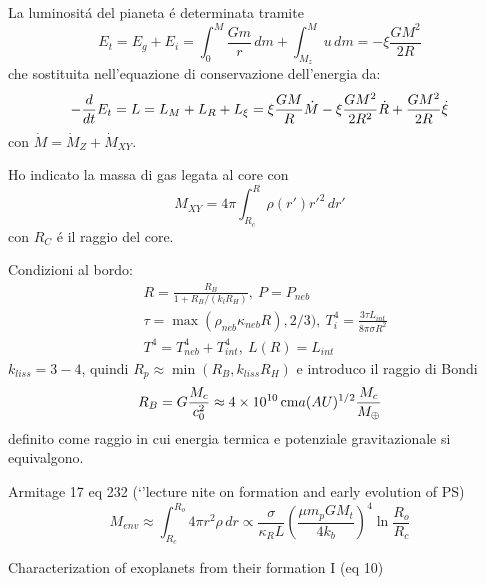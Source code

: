 \begin{reworking}
	La luminosit\'a del pianeta \'e determinata tramite
	\begin{equation}
	E_t=E_g+E_i=\int_0^M\frac{Gm}{r}\,dm+\int_{M_z}^Mu\,dm=-\xi\frac{GM^2}{2R}
	\end{equation}
	che sostituita nell'equazione di conservazione dell'energia da:
	\begin{equation}
	-\frac{d}{d t}E_t=L=L_M+L_R+L_{\xi}=\xi\frac{GM}{R}\dot{M}-\xi\frac{GM^2}{2R^2}\dot{R}+\frac{GM^2}{2R}\dot{\xi}
	\end{equation}
	con $\dot{M}=\dot{M}_Z+\dot{M}_{XY}$.
	
	Ho indicato la massa di gas legata al core con
	\begin{equation}
	M_{XY}=4\pi\int_{R_c}^R\rho(r')r'^2\,dr'
	\end{equation}
	con $R_C$ \'e il raggio del core.
	
	Condizioni al bordo:
	\begin{align}
	&R=\frac{R_B}{1+R_B/(k_lR_H )},\ P=P_{neb}\\
	&\tau=\max{(\rho_{neb}\kappa_{neb}R),2/3)},\ T_i^4=\frac{3\tau L_{int}}{8\pi\sigma R^2}\\
	&T^4=T_{neb}^4+T_{int}^4,\ L(R)=L_{int}
	\end{align}
	$k_{liss}=3-4$, quindi $R_p\approx \min{(R_B,k_{liss}R_H)}$ e introduco il raggio di Bondi
	\begin{equation}
	R_B=G\frac{M_c}{c_0^2}\approx\SI{4e10}{\cm}a(AU)\expy{1/2}\frac{M_c}{\mearth{}}
	\end{equation}
	definito come raggio in cui energia termica e potenziale gravitazionale si equivalgono.%
	
	\begin{workout}
		Armitage 17 eq 232 (`'lecture nite on formation and early evolution of PS)
		\begin{equation}
		M_{env}\approx\int_{R_c}^{R_o}4\pi r^2\rho\,dr\propto\frac{\sigma}{\kappa_RL}(\frac{\mu m_pGM_t}{4k_b})^4\ln{\frac{R_o}{R_c}}
		\end{equation}
	\end{workout}
	
	\begin{workout}
		
	\end{workout}
	
	
	\begin{workout}
		Characterization of exoplanets from their formation I (eq 10)
	\end{workout}
	

\end{reworking}
